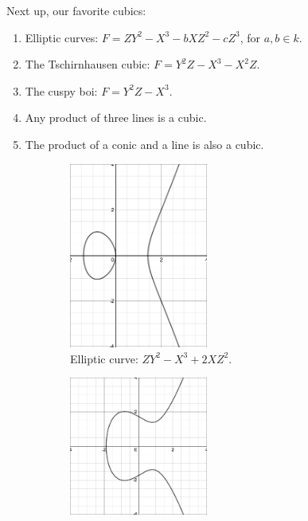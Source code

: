\documentclass[12pt]{article}
\theoremstyle{definition}
\begin{document}
Next up, our favorite cubics:
\begin{enumerate}
    \item Elliptic curves: $F=ZY^2-X^3-bXZ^2-cZ^3$, for $a,b\in k$. 
    \item The Tschirnhausen cubic: $F=Y^2Z-X^3-X^2Z$.
    \item The cuspy boi: $F=Y^2Z-X^3$.
    \item Any product of three lines is a cubic.
    \item The product of a conic and a line is also a cubic.
\end{enumerate}
\begin{figure}[H]
 
    \begin{subfigure}{0.5\textwidth}
        \centering
        \includegraphics[width=0.5\textwidth]{42.png}
        \caption{Elliptic curve: $ZY^2-X^3+2XZ^2$.}
        \label{fig:subim1}
    \end{subfigure}
    \hfill
    \begin{subfigure}{0.5\textwidth}
        \centering
        \includegraphics[width=0.5\textwidth]{47.png}

\end{subfigure}
\end{figure}
\end{document}
